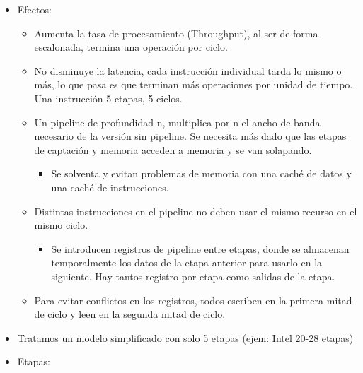 \documentclass[12pt, twoside, openright]{report} %
\begin{document}
\begin{itemize}

	\item Efectos:

	      \begin{itemize}

		      \item Aumenta la tasa de procesamiento (Throughput), al ser de forma
		            escalonada, termina una operación por ciclo.
		      \item No disminuye la latencia, cada instrucción individual tarda lo
		            mismo o más, lo que pasa es que terminan más operaciones por
		            unidad de tiempo. Una instrucción 5 etapas, 5 ciclos.
		      \item Un pipeline de profundidad n, multiplica por n el ancho de banda
		            necesario de la versión sin pipeline. Se necesita más dado que las
		            etapas de captación y memoria acceden a memoria y se van
		            solapando.

		            \begin{itemize}

			            \item Se solventa y evitan problemas de memoria con una caché de datos
			                  y una caché de instrucciones.
		            \end{itemize}
		      \item Distintas instrucciones en el pipeline no deben usar el mismo
		            recurso en el mismo ciclo.

		            \begin{itemize}

			            \item Se introducen registros de pipeline entre etapas, donde se
			                  almacenan temporalmente los datos de la etapa anterior para
			                  usarlo en la siguiente. Hay tantos registro por etapa como
			                  salidas de la etapa.
		            \end{itemize}
		      \item Para evitar conflictos en los registros, todos escriben en la
		            primera mitad de ciclo y leen en la segunda mitad de ciclo.
	      \end{itemize}
	\item Tratamos un modelo simplificado con solo 5 etapas (ejem: Intel 20-28
	      etapas)
	      \pagebreak
	\item Etapas:
	      \begin{figure}[H]
		      {\def\svgwidth{1.1\textwidth}
			      }
	      \end{figure}
	      \begin{itemize}


\end{itemize}
\end{itemize}
\end{document}
